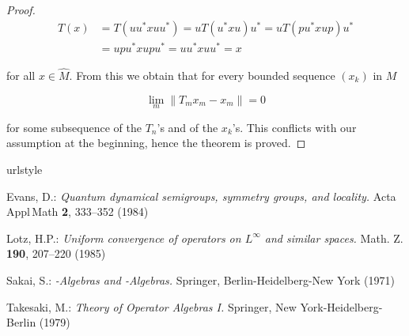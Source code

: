 \begin{proof}
\begin{align*}
T(x) &= T(uu^*xuu^*) = uT(u^*xu)u^* = uT(pu^*xup)u^* \\
&= upu^*xupu^* = uu^*xuu^* = x
\end{align*}

for all $x \in \widehat{M}$.
From this we obtain that for every bounded sequence $(x_k)$ in $M$

\[
\lim_m \|T_m x_m - x_m\| = 0
\]

for some subsequence of the $T_n$'s and of the $x_k$'s.
This conflicts with our assumption at the beginning, hence the theorem is proved.
\end{proof}

%
\begin{thebibliography}{1}
\providecommand{\url}[1]{{#1}}
\providecommand{\urlprefix}{URL }
\expandafter\ifx\csname urlstyle\endcsname\relax
  \providecommand{\doi}[1]{DOI~\discretionary{}{}{}#1}\else
  \providecommand{\doi}{DOI~\discretionary{}{}{}\begingroup
  \urlstyle{rm}\Url}\fi

Evans, D.: \emph{Quantum dynamical semigroups, symmetry groups, and locality.}
\newblock Acta\,Appl\,Math \textbf{2}, 333--352 (1984)

Lotz, H.P.: \emph{Uniform convergence of operators on {$L^{\infty}$} and similar spaces.}
\newblock Math. Z. \textbf{190}, 207--220 (1985)

Sakai, S.: \emph{\CA-Algebras and \WA-Algebras.}
\newblock Springer, Berlin-Heidelberg-New York (1971)

Takesaki, M.: \emph{Theory of Operator Algebras {I}.}
\newblock Springer, New York-Heidelberg-Berlin (1979)

\end{thebibliography}

